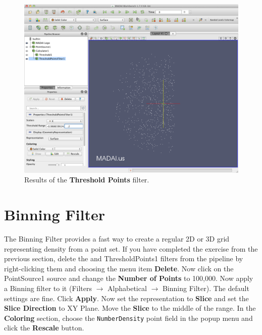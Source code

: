 \documentclass[12pt]{article}
\begin{document}
\begin{figure}[htbp]
   \centering
   \includegraphics[scale=.25]{images/ThresholdPointsFilter.png} %
   \caption{Results of the \textbf{Threshold Points} filter.}
   \label{fig:ThresholdPointsFilter}
\end{figure}

\section{Binning Filter}

The Binning Filter provides a fast way to create a regular 2D or 3D grid representing density from a point set. If you have completed the exercise from the previous section, delete the and ThresholdPoints1 filters from the pipeline by right-clicking them and choosing the menu item \textbf{Delete}. Now click on the PointSource1 source and change the \textbf{Number of Points} to 100,000. Now apply a Binning filter to it (Filters $\rightarrow$ Alphabetical $\rightarrow$ Binning Filter). The default settings are fine. Click \textbf{Apply}. Now set the representation to \textbf{Slice} and set the \textbf{Slice Direction} to XY Plane. Move the \textbf{Slice} to the middle of the range. In the \textbf{Coloring} section, choose the \texttt{NumberDensity} point field in the popup menu and click the \textbf{Rescale} button.
\end{document}
